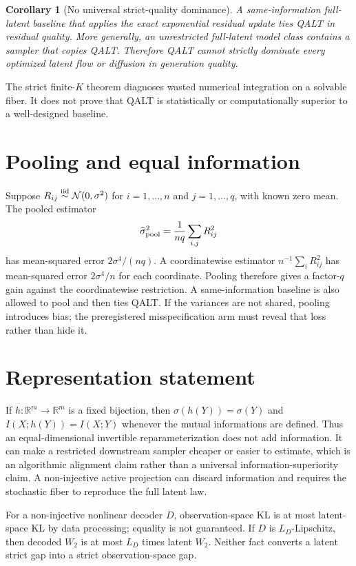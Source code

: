 \documentclass[11pt]{article}
\newtheorem{corollary}{Corollary}
\newcommand{\R}{\mathbb R}
\begin{document}
\begin{corollary}[No universal strict-quality dominance]
A same-information full-latent baseline that applies the exact exponential residual update ties QALT in residual quality.  More generally, an unrestricted full-latent model class contains a sampler that copies QALT.  Therefore QALT cannot strictly dominate every optimized latent flow or diffusion in generation quality.
\end{corollary}

The strict finite-$K$ theorem diagnoses wasted numerical integration on a solvable fiber.  It does not prove that QALT is statistically or computationally superior to a well-designed baseline.

\section{Pooling and equal information}

Suppose $R_{ij}\overset{\rm iid}{\sim}\mathcal N(0,\sigma^2)$ for $i=1,\ldots,n$ and $j=1,\ldots,q$, with known zero mean.  The pooled estimator
\[
 \widehat\sigma^2_{\rm pool}=\frac1{nq}\sum_{i,j}R_{ij}^2
\]
has mean-squared error $2\sigma^4/(nq)$.  A coordinatewise estimator $n^{-1}\sum_iR_{ij}^2$ has mean-squared error $2\sigma^4/n$ for each coordinate.  Pooling therefore gives a factor-$q$ gain against the coordinatewise restriction.  A same-information baseline is also allowed to pool and then ties QALT.  If the variances are not shared, pooling introduces bias; the preregistered misspecification arm must reveal that loss rather than hide it.

\section{Representation statement}

If $h:\R^m\to\R^m$ is a fixed bijection, then $\sigma(h(Y))=\sigma(Y)$ and $I(X;h(Y))=I(X;Y)$ whenever the mutual informations are defined.  Thus an equal-dimensional invertible reparameterization does not add information.  It can make a restricted downstream sampler cheaper or easier to estimate, which is an algorithmic alignment claim rather than a universal information-superiority claim.  A non-injective active projection can discard information and requires the stochastic fiber to reproduce the full latent law.

For a non-injective nonlinear decoder $D$, observation-space KL is at most latent-space KL by data processing; equality is not guaranteed.  If $D$ is $L_D$-Lipschitz, then decoded $W_2$ is at most $L_D$ times latent $W_2$.  Neither fact converts a latent strict gap into a strict observation-space gap.
\end{document}

